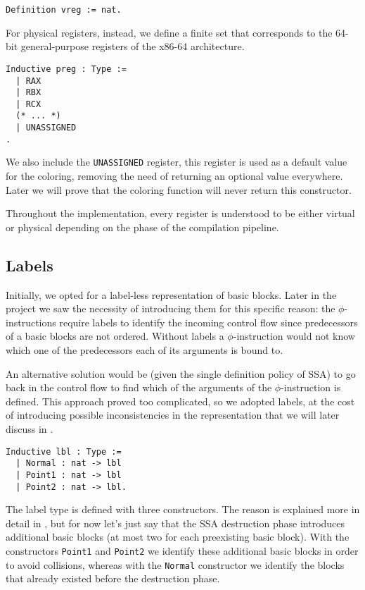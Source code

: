 \begin{lstlisting}[style=Rocq]
Definition vreg := nat.
\end{lstlisting}

For physical registers, instead, we define a finite set that corresponds to the 64-bit general-purpose registers of the x86-64 architecture.

\begin{lstlisting}[style=Rocq]
Inductive preg : Type :=
  | RAX
  | RBX
  | RCX
  (* ... *)
  | UNASSIGNED
.
\end{lstlisting}

We also include the \texttt{UNASSIGNED} register, this register is used as a default value for the coloring, removing the need of returning an optional value everywhere. Later we will prove that the coloring function will never return this constructor.

Throughout the implementation, every register is understood to be either virtual or physical depending on the phase of the compilation pipeline.

\subsection{Labels}

Initially, we opted for a label-less representation of basic blocks.
Later in the project we saw the necessity of introducing them for this specific reason: the $\phi$-instructions require labels to identify the incoming control flow since predecessors of a basic blocks are not ordered. Without labels a $\phi$-instruction would not know which one of the predecessors each of its arguments is bound to.

An alternative solution would be (given the single definition policy of SSA) to go back in the control flow to find which of the arguments of the $\phi$-instruction is defined. This approach proved too complicated, so we adopted labels, at the cost of introducing possible inconsistencies in the representation that we will later discuss in .

\begin{lstlisting}[style=Rocq]
Inductive lbl : Type :=
  | Normal : nat -> lbl
  | Point1 : nat -> lbl
  | Point2 : nat -> lbl.
\end{lstlisting}

The label type is defined with three constructors. The reason is explained more in detail in , but for now let's just say that the SSA destruction phase introduces additional basic blocks (at most two for each preexisting basic block). With the constructors \texttt{Point1} and \texttt{Point2} we identify these additional basic blocks in order to avoid collisions, whereas with the \texttt{Normal} constructor we identify the blocks that already existed before the destruction phase.

